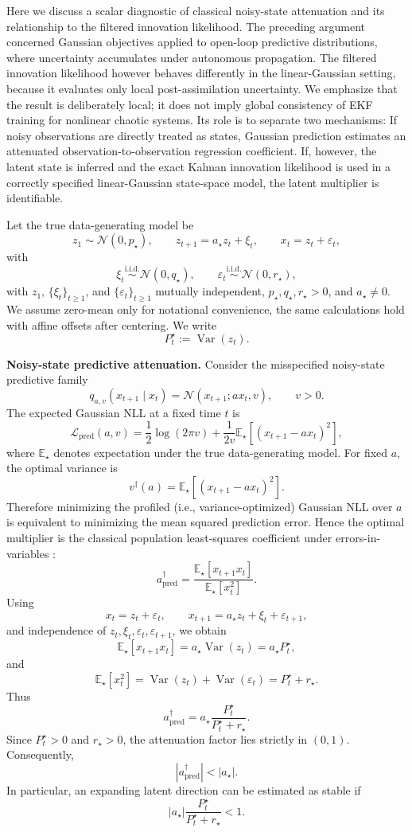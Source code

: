 \documentclass{article}
\theoremstyle{plain}
\theoremstyle{definition}
\theoremstyle{remark}
\newcommand{\E}{\mathbb{E}}
\begin{document}
Here we discuss a scalar diagnostic of classical noisy-state attenuation \citep{fuller1987measurement,staudenmayer2005measurement} and its relationship to the filtered innovation likelihood.  The preceding argument concerned Gaussian objectives applied to open-loop predictive distributions, where uncertainty accumulates under autonomous propagation. The filtered innovation likelihood however behaves differently in the linear-Gaussian setting, because it evaluates only local post-assimilation uncertainty. We emphasize that the result is deliberately local; it does not imply global consistency of EKF training for nonlinear chaotic systems. Its role is to separate two mechanisms: If noisy observations are directly treated as states, Gaussian prediction estimates an attenuated observation-to-observation regression coefficient. If, however, the latent state is inferred and the exact Kalman innovation likelihood is used in a correctly specified linear-Gaussian state-space model, the latent multiplier is identifiable.

Let the true data-generating model be
\[
z_1\sim\mathcal N(0,p_\star),\qquad z_{t+1}=a_\star z_t+\xi_t,\qquad x_t=z_t+\varepsilon_t,
\]
with
\[
\xi_t \overset{\mathrm{i.i.d.}}{\sim}\mathcal N(0,q_\star), \qquad \varepsilon_t \overset{\mathrm{i.i.d.}}{\sim}\mathcal N(0,r_\star),
\]
with $z_1$, $\{\xi_t\}_{t\ge1}$, and $\{\varepsilon_t\}_{t\ge1}$ mutually independent, $p_\star,q_\star,r_\star>0$, and $a_\star\neq0$. We assume zero-mean only for notational convenience, the same calculations hold with affine offsets after centering. We write
\[
P_t^\star:=\operatorname{Var}(z_t).
\]

\textbf{Noisy-state predictive attenuation.}
Consider the misspecified noisy-state predictive family
\[
q_{a,v}(x_{t+1}\mid x_t) = \mathcal N(x_{t+1};a x_t,v),\qquad v>0.
\]
The expected Gaussian NLL at a fixed time $t$ is
\[
\mathcal L_{\mathrm{pred}}(a,v)
=
\frac12\log(2\pi v)
+
\frac{1}{2v}
\E_\star \left[(x_{t+1}-a x_t)^2\right],
\]
where $\E_\star$ denotes expectation under the true data-generating model. For fixed $a$,
the optimal variance is
\[
v^\dagger(a)
=
\E_\star \left[(x_{t+1}-a x_t)^2\right].
\]
Therefore minimizing the profiled (i.e., variance-optimized) Gaussian NLL over $a$ is equivalent to
minimizing the mean squared prediction error. Hence the optimal multiplier is the classical population least-squares coefficient under errors-in-variables \citep{fuller1987measurement,staudenmayer2005measurement}:
\[
a_{\mathrm{pred}}^\dagger
=
\frac{\E_\star[x_{t+1}x_t]}{\E_\star[x_t^2]}.
\]
Using
\[
x_t=z_t+\varepsilon_t,
\qquad
x_{t+1}=a_\star z_t+\xi_t+\varepsilon_{t+1},
\]
and independence of $z_t,\xi_t,\varepsilon_t,\varepsilon_{t+1}$, we obtain
\[
\E_\star[x_{t+1}x_t]
=
a_\star\operatorname{Var}(z_t)
=
a_\star P_t^\star,
\]
and
\[
\E_\star[x_t^2]
=
\operatorname{Var}(z_t)+\operatorname{Var}(\varepsilon_t)
=
P_t^\star+r_\star.
\]
Thus
\[
a_{\mathrm{pred}}^\dagger
=
a_\star
\frac{P_t^\star}{P_t^\star+r_\star}.
\]
Since $P_t^\star>0$ and $r_\star>0$, the attenuation factor lies strictly in
$(0,1)$. Consequently,
\[
|a_{\mathrm{pred}}^\dagger|<|a_\star|.
\]
In particular, an expanding latent direction can be estimated as stable if
\[
|a_\star|
\frac{P_t^\star}{P_t^\star+r_\star}
<1.
\]
\end{document}
